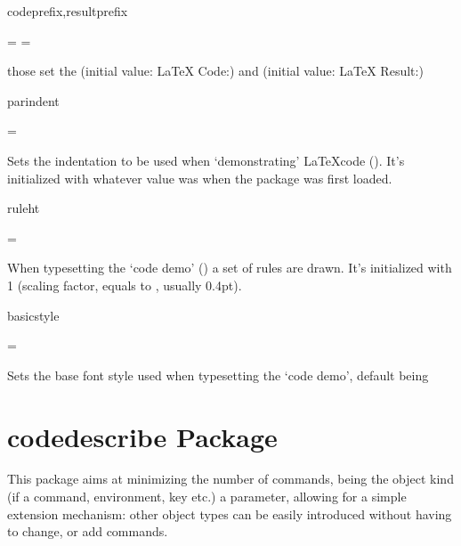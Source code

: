 \documentclass{article}
\begin{document}
\begin{codedescribe}[key]{codeprefix,resultprefix}
\begin{codesyntax} %
	 = 
	 = 
\end{codesyntax}
those set the  (initial value: \LaTeX{} Code:) and  (initial value: \LaTeX{} Result:)
\end{codedescribe}

\begin{codedescribe}[key]{parindent}
\begin{codesyntax} %
	 = 
\end{codesyntax}
Sets the indentation to be used when `demonstrating' \LaTeX{}code (\tsobj[code]{\tsdemo}). It's initialized with whatever value  was when the package was first loaded.
\end{codedescribe}

\begin{codedescribe}[key]{ruleht}
\begin{codesyntax} %
	 = 
\end{codesyntax}
When typesetting the `code demo' (\tsobj{\tsdemo}) a set of rules are drawn. It's initialized with 1 (scaling factor, equals to ,  usually 0.4pt).
\end{codedescribe}

\begin{codedescribe}[key,new=2023/11/18]{basicstyle}
\begin{codesyntax} %
	 = 
\end{codesyntax}
Sets the base font style used when typesetting the `code demo', default being  
\end{codedescribe}

\newpage
\section{codedescribe Package}

This package aims at minimizing the number of commands, being the object kind (if a command, environment, key etc.) a parameter, allowing for a simple extension mechanism: other object types can be easily introduced without having to change, or add commands.
\end{document}
